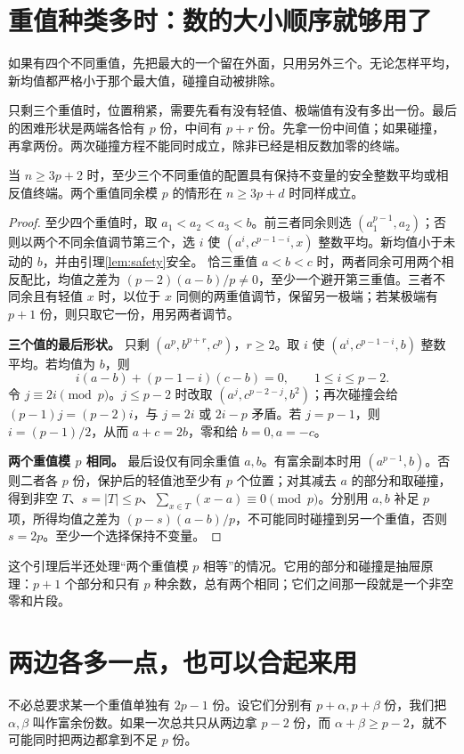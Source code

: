 \section{重值种类多时：数的大小顺序就够用了}
如果有四个不同重值，先把最大的一个留在外面，只用另外三个。无论怎样平均，新均值都严格小于那个最大值，碰撞自动被排除。

只剩三个重值时，位置稍紧，需要先看有没有轻值、极端值有没有多出一份。最后的困难形状是两端各恰有 $p$ 份，中间有 $p+r$ 份。先拿一份中间值；如果碰撞，再拿两份。两次碰撞方程不能同时成立，除非已经是相反数加零的终端。
\begin{lemma}[三个及更多重值的续步]\label{lem:heavy}
当 $n\ge3p+2$ 时，至少三个不同重值的配置具有保持不变量的安全整数平均或相反值终端。两个重值同余模 $p$ 的情形在 $n\ge3p+d$ 时同样成立。
\end{lemma}
\begin{proof}
至少四个重值时，取 $a_1<a_2<a_3<b$。前三者同余则选 $(a_1^{p-1},a_2)$；否则以两个不同余值调节第三个，选 $i$ 使 $(a^i,c^{p-1-i},x)$ 整数平均。新均值小于未动的 $b$，并由引理\ref{lem:safety}安全。
恰三重值 $a<b<c$ 时，两者同余可用两个相反配比，均值之差为 $(p-2)(a-b)/p\ne0$，至少一个避开第三重值。三者不同余且有轻值 $x$ 时，以位于 $x$ 同侧的两重值调节，保留另一极端；若某极端有 $p+1$ 份，则只取它一份，用另两者调节。
\par\noindent\textbf{三个值的最后形状。}
只剩 $(a^p,b^{p+r},c^p)$，$r\ge2$。取 $i$ 使 $(a^i,c^{p-1-i},b)$ 整数平均。若均值为 $b$，则
\[i(a-b)+(p-1-i)(c-b)=0,\qquad1\le i\le p-2.
\]
令 $j\equiv2i\pmod p$。$j\le p-2$ 时改取 $(a^j,c^{p-2-j},b^2)$；再次碰撞会给 $(p-1)j=(p-2)i$，与 $j=2i$ 或 $2i-p$ 矛盾。若 $j=p-1$，则 $i=(p-1)/2$，从而 $a+c=2b$，零和给 $b=0,a=-c$。
\par\noindent\textbf{两个重值模 $p$ 相同。}
最后设仅有同余重值 $a,b$。有富余副本时用 $(a^{p-1},b)$。否则二者各 $p$ 份，保护后的轻值池至少有 $p$ 个位置；对其减去 $a$ 的部分和取碰撞，得到非空 $T$、$s=|T|\le p$、$\sum_{x\in T}(x-a)\equiv0\pmod p$。分别用 $a,b$ 补足 $p$ 项，所得均值之差为 $(p-s)(a-b)/p$，不可能同时碰撞到另一个重值，否则 $s=2p$。至少一个选择保持不变量。
\end{proof}
这个引理后半还处理“两个重值模 $p$ 相等”的情况。它用的部分和碰撞是抽屉原理：$p+1$ 个部分和只有 $p$ 种余数，总有两个相同；它们之间那一段就是一个非空零和片段。

\section{两边各多一点，也可以合起来用}
不必总要求某一个重值单独有 $2p-1$ 份。设它们分别有 $p+\alpha,p+\beta$ 份，我们把 $\alpha,\beta$ 叫作富余份数。如果一次总共只从两边拿 $p-2$ 份，而 $\alpha+\beta\ge p-2$，就不可能同时把两边都拿到不足 $p$ 份。


